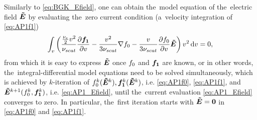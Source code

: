 Similarly to \eqref{eq:BGK_Efield}, one can obtain the~model equation of 
the~electric field $\boldsymbol{\tilde{E}}$ by evaluating the~zero current condition 
(a~velocity integration of \eqref{eq:AP1f1})
\begin{equation}
  \int_{v} \left(\frac{\frac{\nu_{e}}{2}v^2}{\nu_{scat}}
  \frac{\partial{\boldsymbol{f_1}}}{\partial{v}} 
  - \frac{v^2}{3\nu_{scat}}
  \nabla f_0 
  - \frac{v}{3\nu_{scat}}\frac{\partial{f_0}}{\partial{v}}\boldsymbol{\tilde{E}}
  \right) v^2\, \text{d}v = 0 ,
  \label{eq:AP1_Efield}
\end{equation}
from which it is easy to express $\boldsymbol{\tilde{E}}$ once $f_0$ and $\boldsymbol{f_1}$ are known, or
in other words, the~integral-differential model equations need to be solved 
simultaneously, which is achieved by $k$-iteration of 
$f_0^k(\boldsymbol{\tilde{E}}^k), \boldsymbol{f_1}^k(\boldsymbol{\tilde{E}}^k)$, i.e. \eqref{eq:AP1f0}, \eqref{eq:AP1f1}, and 
$\boldsymbol{\tilde{E}}^{k+1}(f_0^k, \boldsymbol{f_1}^k)$, i.e.  \eqref{eq:AP1_Efield}, until 
the~current evaluation \eqref{eq:AP1_Efield} converges to zero. In particular,
the~first iteration starts with $\boldsymbol{\tilde{E}}=\boldsymbol{0}$ in \eqref{eq:AP1f0} and 
\eqref{eq:AP1f1}.

